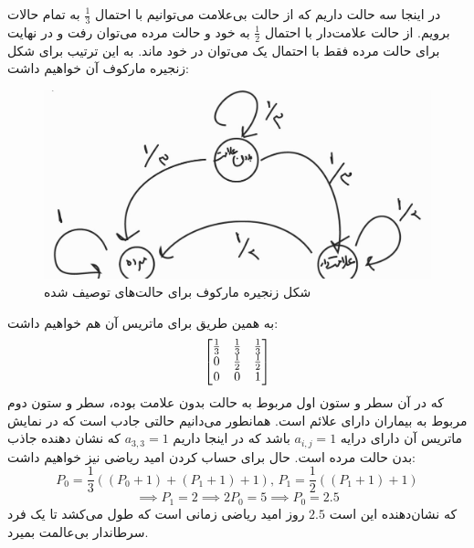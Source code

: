 در اینجا سه حالت داریم که از حالت بی‌علامت می‌توانیم با احتمال 
$\frac{1}{3}$
به تمام حالات برویم. از حالت علامت‌دار با احتمال
$\frac{1}{2}$
به خود و حالت مرده می‌توان رفت و در نهایت برای حالت مرده فقط با احتمال یک می‌توان در خود ماند. به این ترتیب برای شکل زنجیره مارکوف آن خواهیم داشت:
\begin{figure}[h]
    \centering
    \includegraphics[scale = 0.3]{"commons/second.jpg"}
    \caption{شکل زنجیره مارکوف برای حالت‌های توصیف شده}
\end{figure}

به همین طریق برای ماتریس آن هم خواهیم داشت:
$$\mqty[\frac{1}{3} & \frac{1}{3} & \frac{1}{3} \\ 0 & \frac{1}{2} & \frac{1}{2} \\ 0 & 0 & 1]$$
که در آن سطر و ستون اول مربوط به حالت بدون علامت بوده، سطر و ستون دوم مربوط به بیماران دارای علائم است. همانطور می‌دانیم حالتی جادب است که در نمایش ماتریس آن دارای درایه 
$a_{i, j} = 1$ 
باشد که در اینجا داریم
$a_{3, 3} = 1$
که نشان دهنده جاذب بدن حالت مرده است. حال برای حساب کردن امید ریاضی نیز خواهیم داشت:
$$P_0 = \frac{1}{3}((P_0 + 1) + (P_1 + 1) + 1),\, P_1 = \frac{1}{2}((P_1 + 1) + 1)$$
$$\implies P_1 = 2 \implies 2 P_0 = 5 \implies P_0 = 2.5$$
که نشان‌دهنده این است
$2.5$
روز امید ریاضی زمانی است که طول می‌کشد تا یک فرد سرطاندار بی‌عالمت بمیرد.